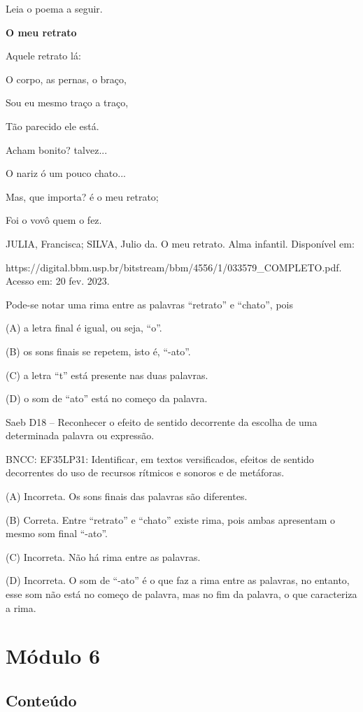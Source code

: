 Leia o poema a seguir.

\textbf{O meu retrato}

Aquele retrato lá:

O corpo, as pernas, o braço,

Sou eu mesmo traço a traço,

Tão parecido ele está.

Acham bonito? talvez...

O nariz ó um pouco chato...

Mas, que importa? é o meu retrato;

Foi o vovô quem o fez.

JULIA, Francisca; SILVA, Julio da. O meu retrato. Alma infantil.
Disponível em:

https://digital.bbm.usp.br/bitstream/bbm/4556/1/033579\_COMPLETO.pdf.
Acesso em: 20 fev. 2023.

Pode-se notar uma rima entre as palavras ``retrato'' e ``chato'', pois

(A) a letra final é igual, ou seja, ``o''.

(B) os sons finais se repetem, isto é, ``-ato''.

(C) a letra ``t'' está presente nas duas palavras.

(D) o som de ``ato'' está no começo da palavra.

Saeb D18 -- Reconhecer o efeito de sentido decorrente da escolha de uma
determinada palavra ou expressão.

BNCC: EF35LP31: Identificar, em textos versificados, efeitos de sentido
decorrentes do uso de recursos rítmicos e sonoros e de metáforas.

(A) Incorreta. Os sons finais das palavras são diferentes.

(B) Correta. Entre ``retrato'' e ``chato'' existe rima, pois ambas
apresentam o mesmo som final ``-ato''.

(C) Incorreta. Não há rima entre as palavras.

(D) Incorreta. O som de ``-ato'' é o que faz a rima entre as palavras,
no entanto, esse som não está no começo de palavra, mas no fim da
palavra, o que caracteriza a rima.

\section{Módulo 6}\label{muxf3dulo-6}

\subsection{Conteúdo}\label{conteuxfado-5}

